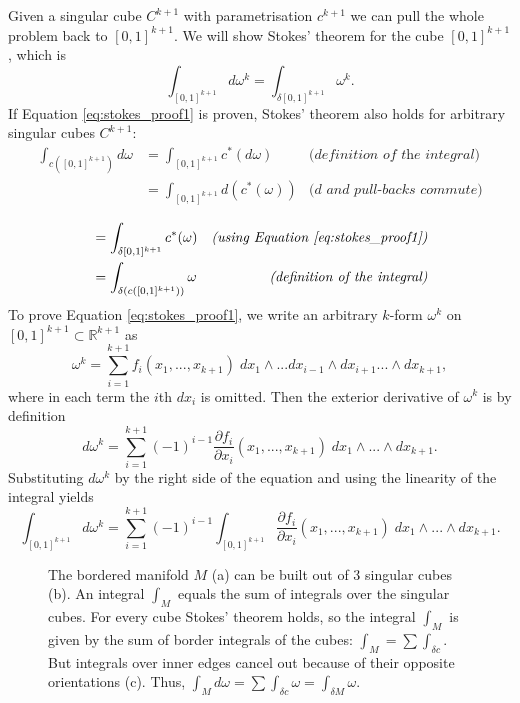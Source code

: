Given a singular cube $C^{k+1}$ with parametrisation $c^{k+1}$ we can pull the whole problem back to $[0,1]^{k+1}$. We will show Stokes' theorem for the cube $[0,1]^{k+1}$, which is 
\begin{equation}
\int_{[0,1]^{k+1}} d \omega^k = \int_{\delta [0,1]^{k+1}}\omega^k. 
\label{eq:stokes_proof1}
\end{equation}
If Equation \ref{eq:stokes_proof1} is proven, Stokes' theorem also holds for arbitrary singular cubes $C^{k+1}$:
\begin{align*}
\int_{c([0,1]^{k+1})}d \omega &= \int_{[0,1]^{k+1}} c^*(d\omega) & \textit{(definition of the integral)} \\
&= \int_{[0,1]^{k+1}} d(c^*(\omega)) & \textit{($d$ and pull-backs commute)}\\ \end{align*} 
\begin{align*}
&= \int_{\delta [0,1]^{k+1}} c^*(\omega) & \textit{(using Equation \ref{eq:stokes_proof1})}\\
& = \int_{\delta(c([0,1]^{k+1}))} \omega & \textit{(definition of the integral)}
\end{align*} 
To prove Equation \ref{eq:stokes_proof1}, we write an arbitrary $k$-form $\omega^k$ on $[0,1]^{k+1} \subset \mathbb R^{k+1}$ as 
\[\omega^k = \sum_{i=1}^{k+1} f_i(x_1,...,x_{k+1})\; dx_1 \wedge...dx_{i-1} \wedge dx_{i+1} ...\wedge dx_{k+1},\]
where in each term the $i$th $dx_i$ is omitted. Then the exterior derivative of $\omega^k$ is by definition
\[d\omega^k = \sum_{i=1}^{k+1}(-1)^{i-1}\frac{\partial f_i}{\partial x_i}(x_1,...,x_{k+1})\;dx_1\wedge ... \wedge dx_{k+1}.\]
Substituting $d\omega^k$ by the right side of the equation and using the linearity of the integral yields
\[\int_{[0,1]^{k+1}} d \omega^k = \sum_{i=1}^{k+1}(-1)^{i-1} \int_{[0,1]^{k+1}} \frac{\partial f_i}{\partial x_i}(x_1,...,x_{k+1})\; dx_1 \wedge...\wedge dx_{k+1}.\]

\begin{figure}[t]
\begin{center}
\def\svgwidth{11cm}

\end{center}
\caption{The bordered manifold $M$ (a) can be built out of 3 singular cubes (b). An integral $\int_M$ equals the sum of integrals over the singular cubes. For every cube Stokes' theorem holds, so the integral $\int_M$ is given by the sum of border integrals of the cubes: $\int_M = \sum \int_{\delta c}$. But integrals over inner edges cancel out because of their opposite orientations (c). Thus, $\int_M d\omega= \sum \int_{\delta c} \omega =\int_{\delta M}\omega$.} 
\label{fig::6_1_singularCubes}
\end{figure}



